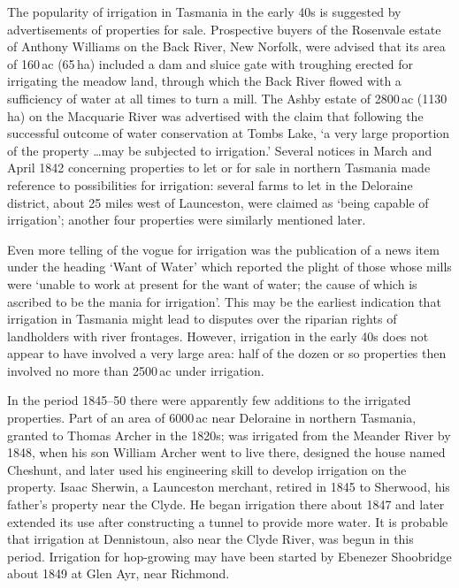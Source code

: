 The popularity of irrigation in Tasmania in the early 40s is suggested
by advertisements of properties for sale.  Prospective buyers of the
Rosenvale estate of Anthony Williams on the Back River, New Norfolk,
were advised that its area of 160\,ac (65\,ha) included a dam and
sluice gate with troughing erected for irrigating the meadow land,
through which the Back River flowed with a sufficiency of water at all
times to turn a mill.  The
Ashby estate of 2800\,ac (1130\,ha) on the Macquarie River was
advertised with the claim that following the successful outcome of
water conservation at Tombs Lake, `a very large proportion of the
property \ldots may be subjected to irrigation.'  Several notices in March and April 1842
concerning properties to let or for sale in northern Tasmania made
reference to possibilities for irrigation: several farms to let in the
Deloraine district, about 25 miles west of Launceston, were claimed as
`being capable of irrigation'; another four properties were similarly
mentioned later.

Even more telling of the vogue for irrigation was the publication of a
news item under the heading `Want of Water' which reported the plight
of those whose mills were `unable to work at present for the want of
water; the cause of which is ascribed to be the mania for
irrigation'.  This may be the
earliest indication that irrigation in Tasmania might lead to disputes
over the riparian rights of landholders with river frontages.
However, irrigation in the early 40s does not appear to have involved
a very large area: half of the dozen or so properties then involved no
more than 2500\,ac under irrigation.

In the period 1845--50 there were apparently few additions to the
irrigated properties.  Part of an area of 6000\,ac near Deloraine in
northern Tasmania, granted to Thomas Archer in the 1820s; was
irrigated from the Meander River by 1848, when his son William Archer
went to live there, designed the house named Cheshunt, and later used
his engineering skill to develop irrigation on the
property.  Isaac Sherwin, a
Launceston merchant, retired in 1845 to Sherwood, his father's
property near the Clyde.  He began irrigation there about 1847 and
later extended its use after constructing a tunnel to provide more
water.  It is probable
that irrigation at Dennistoun, also near the Clyde River, was begun in
this period.  Irrigation for
hop-growing may have been started by Ebenezer Shoobridge about 1849 at
Glen Ayr, near Richmond.


